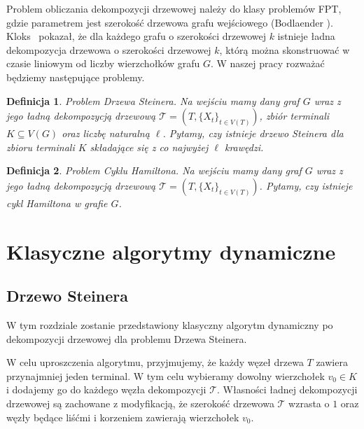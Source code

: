 \documentclass[12pt, oneside]{report}
\newtheorem{definition}{Definicja}
\begin{document}
Problem obliczania dekompozycji drzewowej należy do klasy problemów FPT, gdzie parametrem jest szerokość drzewowa grafu wejściowego (Bodlaender \cite{bodlaender}). Kloks~\cite{kloks} pokazał, że dla każdego grafu o szerokości drzewowej $k$ istnieje ładna dekompozycja drzewowa o szerokości drzewowej $k$, którą można skonstruować w czasie liniowym od liczby wierzchołków grafu $G$.
\newline\newline
\noindent W naszej pracy rozważać będziemy następujące problemy.

\begin{definition}
\em \emph{Problem Drzewa Steinera.} Na wejściu mamy dany graf $G$ wraz z jego ładną dekompozycją drzewową $\mathcal{T} = (T, \{X_t\}_{t \in V(T)})$, zbiór terminali $K \subseteq V(G)$ oraz liczbę naturalną $\ell$. Pytamy, czy istnieje drzewo Steinera dla zbioru terminali $K$ składające się z co najwyżej $\ell$ krawędzi.
\end{definition}

\begin{definition}
\em \emph{Problem Cyklu Hamiltona.} Na wejściu mamy dany graf $G$ wraz z jego ładną dekompozycją drzewową $\mathcal{T} = (T, \{X_t\}_{t \in V(T)})$. Pytamy, czy istnieje cykl Hamiltona w grafie $G$.
\end{definition}

\newpage
  	\chapter{Klasyczne algorytmy dynamiczne}
    	\section{Drzewo Steinera}
    	
W tym rozdziale zostanie przedstawiony klasyczny algorytm dynamiczny po dekompozycji drzewowej dla problemu Drzewa Steinera.

W celu uproszczenia algorytmu, przyjmujemy, że każdy węzeł drzewa $T$ zawiera przynajmniej jeden terminal. W tym celu wybieramy dowolny wierzchołek $v_0 \in K$ i dodajemy go do każdego węzła dekompozycji $\mathcal{T}$. Własności ładnej dekompozycji drzewowej są zachowane z modyfikacją, że szerokość drzewowa $\mathcal{T}$ wzrasta o $1$ oraz węzły będące liśćmi i korzeniem zawierają wierzchołek $v_0$.
\end{document}
